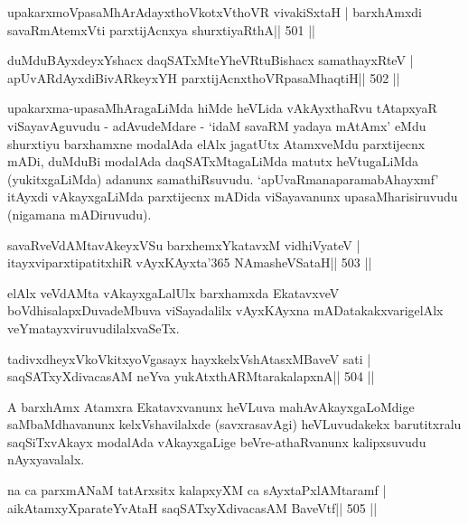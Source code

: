 
 
\begin{shl}
upakarxmoVpasaMhArAdayxthoVkotxV\s thoVR vivakiSxtaH |
barxhAmxdi savaRmAtemxVti parxtijAcnxya shurxtiyaRthA\hfill || 501 ||
\end{shl}

\begin{shl}
duMduBAyxdeyxYshacx daqSATxMteYheVRtuBishacx samathayxRteV |
apUvARdAyxdiBivARkeyxYH parxtijAcnxthoVRpasaMhaqtiH\hfill || 502 ||
\end{shl}

\begin{artha}
upakarxma-upasaMhAragaLiMda hiMde heVLida vAkAyxthaRvu tAtapxyaR
viSayavAguvudu - adAvudeMdare - `idaM savaRM yadaya mAtAmx' eMdu
shurxtiyu barxhamxne modalAda elAlx jagatUtx AtamxveMdu parxtijecnx
mADi, duMduBi modalAda daqSATxMtagaLiMda matutx heVtugaLiMda
(yukitxgaLiMda) adanunx samathiRsuvudu. `apUvaRmanaparamabAhayxmf'
itAyxdi vAkayxgaLiMda parxtijecnx mADida viSayavanunx
upasaMharisiruvudu (nigamana mADiruvudu).
\end{artha}

\begin{shl}
savaRveVdAMtavAkeyxVSu barxhemxYkatavxM vidhiVyateV |
itayxviparxtipatitxhiR vAyxKAyxta\char'365 NAmasheVSataH\hfill || 503 ||
\end{shl}

\begin{artha}
elAlx veVdAMta vAkayxgaLalUlx barxhamxda EkatavxveV boVdhisalapxDuvadeMbuva viSayadalilx vAyxKAyxna mADatakakxvarigelAlx veYmatayxviruvudilalxvaSeTx.
\end{artha}

\begin{shl}
tadivxdheyxVkoVkitxyoVgasayx hayxkelxVshAtasxMBaveV sati |
saqSATxyXdivacasAM neYva yukAtx\s thARMtarakalapxnA\hfill || 504 ||
\end{shl}

\begin{artha}
A barxhAmx Atamxra Ekatavxvanunx heVLuva mahAvAkayxgaLoMdige saMbaMdhavanunx kelxVshavilalxde (savxrasavAgi) heVLuvudakekx barutitxralu saqSiTxvAkayx modalAda vAkayxgaLige beVre-athaRvanunx kalipxsuvudu nAyxyavalalx.
\end{artha}

\begin{shl}
na ca parxmANaM tatArxsitx kalapxyXM ca sAyxtaPxlAMtaramf |
aikAtamxyXparateYvAtaH saqSATxyXdivacasAM BaveVtf\hfill || 505 ||
\end{shl}

